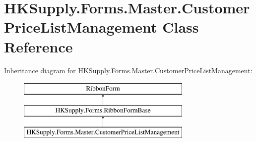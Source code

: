 \hypertarget{class_h_k_supply_1_1_forms_1_1_master_1_1_customer_price_list_management}{}\section{H\+K\+Supply.\+Forms.\+Master.\+Customer\+Price\+List\+Management Class Reference}
\label{class_h_k_supply_1_1_forms_1_1_master_1_1_customer_price_list_management}
Inheritance diagram for H\+K\+Supply.\+Forms.\+Master.\+Customer\+Price\+List\+Management\+:\begin{figure}[H]
\begin{center}
\leavevmode
\includegraphics[height=3.000000cm]{class_h_k_supply_1_1_forms_1_1_master_1_1_customer_price_list_management}
\end{center}
\end{figure}
